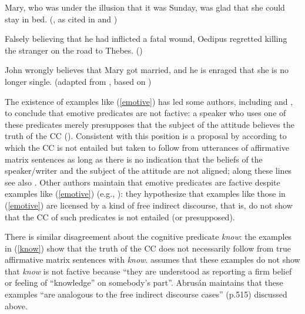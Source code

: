 \documentclass[11pt,fleqn]{article}
\newcommand{\6}{\mbox{$[\hspace*{-.6mm}[$}}
\newcommand{\9}{\mbox{$]\hspace*{-.6mm}]$}}
\begin{document}
\begin{exe}
\ex\label{emotive}
\begin{xlist}

\ex\label{heim2} Mary, who was under the illusion that it was Sunday, was glad that she could stay in bed. (\citealt{klein1975}, as cited in \citealt[122]{gazdar79a} and \citealt[fn37]{heim92}) 

\ex Falsely believing that he had inflicted a fatal wound, Oedipus regretted killing the stranger on the road to Thebes. \hfill (\citealt{klein1975})

\ex John wrongly believes that Mary got married, and he is enraged that she is no longer single. \hspace*{.2cm} \hfill (adapted from \citealt{egre2008}, based on \citealt{schlenker03})

\end{xlist}
\end{exe}
The existence of examples like (\ref{emotive}) has led some authors, including \citet{klein1975,giannakidou1998,schlenker2003} and \citet{egre2008}, to conclude that emotive predicates are not factive: a speaker who uses one of these predicates merely presupposes that the subject of the attitude believes the truth of the CC (\citealt{heim92}). Consistent with this position is a proposal by \citet{karttunen2016} according to which the CC is not entailed but taken to follow from utterances of affirmative matrix sentences as long as there is no indication that the beliefs of the speaker/writer and the subject of the attitude are not aligned; along these lines see also \citealt{djaerv-thesis}. %
Other authors maintain that emotive predicates are factive despite examples like (\ref{emotive}) (e.g., \citealt{gazdar79a,abrusan2011,anand-hacquard2014}): they hypothesize that examples like those in (\ref{emotive}) are licensed by a kind of free indirect discourse, that is, do not show that the CC of such predicates is not entailed (or presupposed). 

There is similar disagreement about the cognitive predicate {\em know}: the examples in (\ref{know}) show that the truth of the CC does not necessarily follow from true affirmative matrix sentences with {\em know}. \citet{abrusan2011} assumes that these examples do not show that {\em know} is not factive because ``they are understood as reporting a firm belief or feeling of ``knowledge'' on somebody's part''. Abrus\'an maintains that these examples ``are analogous to the free indirect discourse cases'' (p.515) discussed above.
\end{document}
